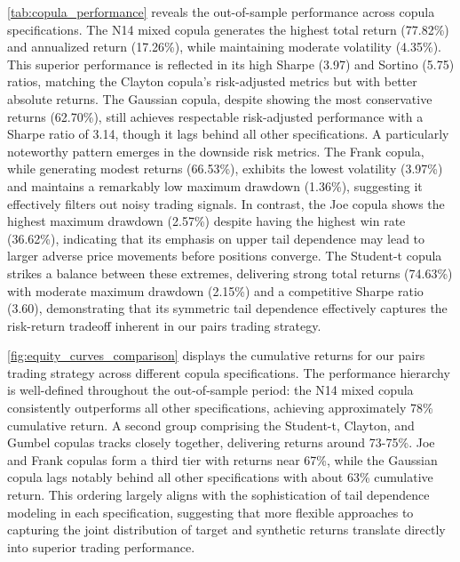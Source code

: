 \cref{tab:copula_performance} reveals the out-of-sample performance across copula specifications. The N14 mixed copula generates the highest total return (77.82\%) and annualized return (17.26\%), while maintaining moderate volatility (4.35\%). This superior performance is reflected in its high Sharpe (3.97) and Sortino (5.75) ratios, matching the Clayton copula's risk-adjusted metrics but with better absolute returns. The Gaussian copula, despite showing the most conservative returns (62.70\%), still achieves respectable risk-adjusted performance with a Sharpe ratio of 3.14, though it lags behind all other specifications.
A particularly noteworthy pattern emerges in the downside risk metrics. The Frank copula, while generating modest returns (66.53\%), exhibits the lowest volatility (3.97\%) and maintains a remarkably low maximum drawdown (1.36\%), suggesting it effectively filters out noisy trading signals. In contrast, the Joe copula shows the highest maximum drawdown (2.57\%) despite having the highest win rate (36.62\%), indicating that its emphasis on upper tail dependence may lead to larger adverse price movements before positions converge. The Student-t copula strikes a balance between these extremes, delivering strong total returns (74.63\%) with moderate maximum drawdown (2.15\%) and a competitive Sharpe ratio (3.60), demonstrating that its symmetric tail dependence effectively captures the risk-return tradeoff inherent in our pairs trading strategy.


\cref{fig:equity_curves_comparison} displays the cumulative returns for our pairs trading strategy across different copula specifications. The performance hierarchy is well-defined throughout the out-of-sample period: the N14 mixed copula consistently outperforms all other specifications, achieving approximately 78\% cumulative return. A second group comprising the Student-t, Clayton, and Gumbel copulas tracks closely together, delivering returns around 73-75\%. Joe and Frank copulas form a third tier with returns near 67\%, while the Gaussian copula lags notably behind all other specifications with about 63\% cumulative return. This ordering largely aligns with the sophistication of tail dependence modeling in each specification, suggesting that more flexible approaches to capturing the joint distribution of target and synthetic returns translate directly into superior trading performance.

